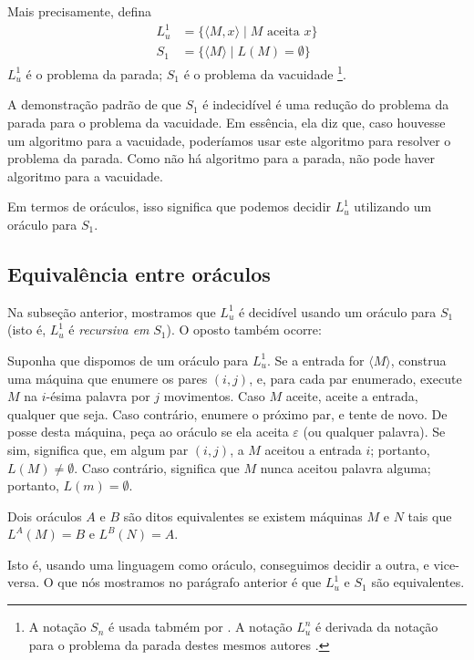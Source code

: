Mais precisamente, defina
\begin{align*}
    L_u^1 &= \{ \langle M, x \rangle \mid M \text{ aceita } x \} \\
    S_1 &= \{ \langle M \rangle \mid L(M) = \emptyset \}
\end{align*}
$L_u^1$ é o problema da parada; $S_1$ é o problema da vacuidade%
\footnote{
    A notação $S_n$ é usada tabmém por .
    A notação $L_u^n$ é derivada da notação para o problema da parada
    destes mesmos autores \cite[p. 183]{HopcroftUllman1979}.
}.

A demonstração padrão de que $S_1$ é indecidível
é uma redução do problema da parada para o problema da vacuidade.
Em essência, ela diz que,
caso houvesse um algoritmo para a vacuidade,
poderíamos usar este algoritmo para resolver o problema da parada.
Como não há algoritmo para a parada,
não pode haver algoritmo para a vacuidade.

Em termos de oráculos,
isso significa que podemos decidir $L_u^1$
utilizando um oráculo para $S_1$.

\subsection{Equivalência entre oráculos}

Na subseção anterior,
mostramos que $L_u^1$ é decidível usando um oráculo para $S_1$
(isto é, $L_u^1$ é \emph{recursiva em} $S_1$).
O oposto também ocorre:

Suponha que dispomos de um oráculo para $L_u^1$.
Se a entrada for $\langle M \rangle$,
construa uma máquina que enumere os pares $(i, j)$,
e, para cada par enumerado,
execute $M$ na $i$-ésima palavra por $j$ movimentos.
Caso $M$ aceite, aceite a entrada, qualquer que seja.
Caso contrário, enumere o próximo par, e tente de novo.
De posse desta máquina, peça ao oráculo se ela aceita $\varepsilon$
(ou qualquer palavra).
Se sim, significa que, em algum par $(i, j)$,
a $M$ aceitou a entrada $i$; portanto, $L(M) \neq \emptyset$.
Caso contrário, significa que $M$ nunca aceitou palavra alguma;
portanto, $L(m) = \emptyset$.

\begin{definition}
    Dois oráculos $A$ e $B$ são ditos equivalentes
    se existem máquinas $M$ e $N$ tais que
    $L^A(M) = B$ e $L^B(N) = A$.
\end{definition}

Isto é, usando uma linguagem como oráculo, conseguimos decidir a outra,
e vice-versa.
O que nós mostramos no parágrafo anterior é que
$L_u^1$ e $S_1$ são equivalentes.

